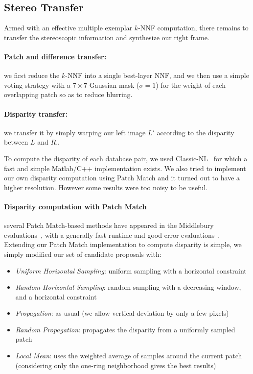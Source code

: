
\subsection{Stereo Transfer}
\label{sec:transfer}
Armed with an effective multiple exemplar $k$-NNF computation, there remains to transfer the stereoscopic information and synthesize our right frame.

\paragraph{Patch and difference transfer:} we first reduce the $k$-NNF into a single best-layer NNF, and we then use a simple voting strategy with a $7\times 7$ Gaussian mask ($\sigma=1$) for the weight of each overlapping patch so as to reduce blurring.

\paragraph{Disparity transfer:} we transfer it by simply warping our left image $L'$ according to the disparity between $L$ and $R$..

To compute the disparity of each database pair, we used Classic-NL~\cite{Deqing10} for which a fast and simple Matlab/C++ implementation exists.
We also tried to implement our own disparity computation using Patch Match and it turned out to have a higher resolution. However some results were too noisy to be useful.

\paragraph{Disparity computation with Patch Match} several Patch Match-based methods have appeared in the Middlebury evaluations~\cite{Scharstein02}, with a generally fast runtime and good error evaluations~\cite{Bleyer11, Heise13, Jiangbo13, Besse14}.
Extending our Patch Match implementation to compute disparity is simple, we simply modified our set of candidate proposals with:
\begin{itemize}
	\item \emph{Uniform Horizontal Sampling}: uniform sampling with a horizontal constraint
	\item \emph{Random Horizontal Sampling}: random sampling with a decreasing window, and a horizontal constraint
	\item \emph{Propagation}: as usual (we allow vertical deviation by only a few pixels)
	\item \emph{Random Propagation}: propagates the disparity from a uniformly sampled patch
	\item \emph{Local Mean}: uses the weighted average of samples around the current patch (considering only the one-ring neighborhood gives the best results)
\end{itemize}

